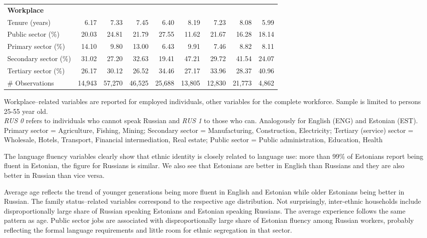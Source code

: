 \documentclass[12pt, a4paper]{article}
\begin{document}
\begin{table}
\begin{tabular}{l|rrrr|rrrr}
		\textbf{Workplace}          &        &        &        &        &        &        &        &        \\
		Tenure (years)              & 6.17   & 7.33   & 7.45   & 6.40   & 8.19   & 7.23   & 8.08   & 5.99   \\
		Public sector (\%)          & 20.03  & 24.81  & 21.79  & 27.55  & 11.62  & 21.67  & 16.28  & 18.14  \\
		Primary sector (\%)         & 14.10  & 9.80   & 13.00  & 6.43   & 9.91   & 7.46   & 8.82   & 8.11   \\
		Secondary sector (\%)       & 31.02  & 27.20  & 32.63  & 19.41  & 47.21  & 29.72  & 41.54  & 24.07  \\
		Tertiary sector (\%)        & 26.17  & 30.12  & 26.52  & 34.46  & 27.17  & 33.96  & 28.37  & 40.96  \\
		\# Observations             & 14,943 & 57,270 & 46,525 & 25,688 & 13,805 & 12,830 & 21,773 & 4,862  \\ \bottomrule
	\end{tabular}%
	\label{tab:descriptive}%
        \begin{flushleft}
          \small Workplace--related variables are reported for
          employed individuals, other variables for the complete
          workforce.  Sample is limited to persons
          25-55 year old.\\
          \emph{RUS 0} refers to individuals who cannot speak
          Russian and \emph{RUS 1} to those who can. Analogously for
          English (ENG) and
          Estonian (EST).\\
          Primary sector = Agriculture, Fishing, Mining; Secondary
          sector = Manufacturing, Construction, Electricity;
          Tertiary (service) sector = Wholesale, Hotels, Transport,
          Financial intermediation, Real estate; Public sector =
          Public administration, Education, Health
        \end{flushleft}
\end{table}%

The language fluency variables clearly show that ethnic identity is
closely related to language use: more than 99\% of Estonians report
being fluent in Estonian, the figure for Russians is similar. We
also see that Estonians are better in English than Russians and they
are also better in Russian than vice versa.

Average age reflects the trend of younger generations
being more fluent in English and Estonian while older Estonians being
better in Russian. The family status--related variables correspond to the
respective age distribution. Not surprisingly, inter-ethnic
households include disproportionally large share of Russian speaking
Estonians and Estonian speaking Russians.
The average experience follows the same pattern as age.
Public sector jobs are associated with disproportionally large share of
Estonian fluency among Russian workers, probably reflecting the formal
language requirements and little room for ethnic segregation in that
sector.
\end{document}
